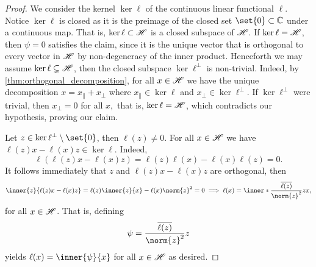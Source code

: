 \begin{proof}
    We consider the kernel \(\ker \ell\) of the continuous linear functional \(\ell\). Notice \(\ker\ell\) is closed as it is the preimage of the closed set \(\set{0} \subset \mathbb{C}\) under a continuous map. That is, \(\ker \ell \subset \mathscr{H}\) is a closed subspace of \(\mathscr{H}\). If \(\ker \ell = \mathscr{H}\), then \(\psi = 0\) satisfies the claim, since it is the unique vector that is orthogonal to every vector in \(\mathscr{H}\) by non-degeneracy of the inner product. Henceforth we may assume \(\ker \ell \subsetneq \mathscr{H}\), then the closed subspace \(\ker\ell^\perp\) is non-trivial. Indeed, by \cref{thm:orthogonal_decomposition}, for all \(x \in \mathscr{H}\) we have the unique decomposition \(x = x_\parallel + x_\perp\) where \(x_\parallel \in \ker \ell\) and \(x_\perp \in \ker \ell^\perp\). If \(\ker\ell^\perp\) were trivial, then \(x_\perp = 0\) for all \(x,\) that is, \(\ker \ell = \mathscr{H}\), which contradicts our hypothesis, proving our claim.

    Let \(z \in \ker\ell^\perp\setminus\set{0}\), then \(\ell(z) \neq 0\). For all \(x \in \mathscr{H}\) we have \(\ell(z)x - \ell(x)z \in \ker\ell\). Indeed,
    \begin{equation*}
        \ell\left(\ell(z)x - \ell(x)z\right) = \ell(z)\ell(x) - \ell(x)\ell(z) = 0.
    \end{equation*}
    It follows immediately that \(z\) and \(\ell(z)x - \ell(x)z\) are orthogonal, then
    \begin{equation*}
        \inner{z}{\ell(z)x - \ell(x)z} = \ell(z) \inner{z}{x} - \ell(x) \norm{z}^2 = 0 \implies \ell(x) = \inner*{\frac{\conj{\ell(z)}}{\norm{z}^2}z}{x},
    \end{equation*}
    for all \(x \in \mathscr{H}\). That is, defining
    \begin{equation*}
        \psi = \frac{\conj{\ell(z)}}{\norm{z}^2}z
    \end{equation*}
    yields \(\ell(x) = \inner{\psi}{x}\) for all \(x \in \mathscr{H}\) as desired.


\end{proof}
